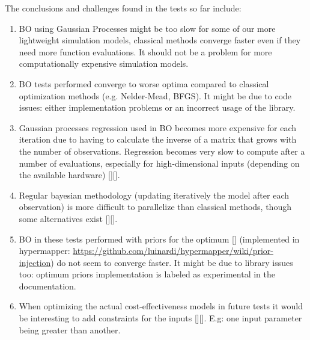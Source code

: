 The conclusions and challenges found in the tests so far include:
\begin{enumerate}
	\item BO using Gaussian Processes might be too slow for some of our more lightweight simulation models, classical methods converge faster even if they need more function evaluations. It should not be a problem for more computationally expensive simulation models.
	\item BO tests performed converge to worse optima compared to classical optimization methods (e.g. Nelder-Mead, BFGS). It might be due to code issues: either implementation problems or an incorrect usage of the library.
	\item Gaussian processes regression used in BO becomes more expensive for each iteration due to having to calculate the inverse of a matrix that grows with the number of observations. Regression becomes very slow to compute after a number of evaluations, especially for high-dimensional inputs (depending on the available hardware) [\cite{proposal:fast_gaussian}][\cite{proposal:splitting_gaussian}].
	\item Regular bayesian methodology (updating iteratively the model after each observation) is more difficult to parallelize than classical methods, though some alternatives exist [\cite{proposal:parallel_bayesian}][\cite{proposal:parallel_bayesian2}].
	\item BO in these tests performed with priors for the optimum [\cite{souza_bayesian_2021}] (implemented in hypermapper: \url{https://github.com/luinardi/hypermapper/wiki/prior-injection}) do not seem to converge faster. It might be due to library issues too: optimum priors implementation is labeled as experimental in the documentation.
	\item When optimizing the actual cost-effectiveness models in future tests it would be interesting to add constraints for the inputs [\cite{gardner_bayesian_nodate}][\cite{ungredda_bayesian_2021}]. E.g: one input parameter being greater than another.
\end{enumerate}
